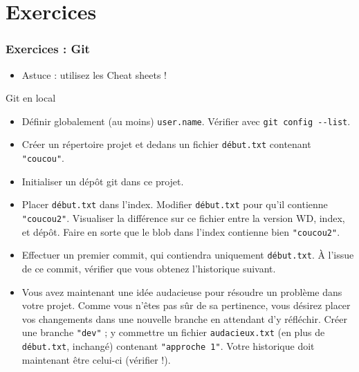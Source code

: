 \documentclass[english, french]{beamer}
\begin{document}
\section{Exercices}
\begin{frame}[allowframebreaks]
	\small
	\frametitle{Exercices : Git}
	\begin{itemize}
		\item Astuce : utilisez les Cheat sheets !
	\end{itemize}
	Git en local
	\begin{itemize}
		\item Définir globalement (au moins) \texttt{user.name}. Vérifier avec \texttt{git config -{}-list}.
		\item Créer un répertoire projet et dedans un fichier \texttt{début.txt} contenant \texttt{"coucou"}.
		\item Initialiser un dépôt git dans ce projet.
		\item Placer \texttt{début.txt} dans l’index. Modifier \texttt{début.txt} pour qu’il contienne \texttt{"coucou2"}. Visualiser la différence sur ce fichier entre la version WD, index, et dépôt. Faire en sorte que le blob dans l’index contienne bien \texttt{"coucou2"}.
		\item Effectuer un premier commit, qui contiendra uniquement \texttt{début.txt}. À l’issue de ce commit, vérifier que vous obtenez l’historique suivant.\par
		{
			\centering
			\par
		}
		\item Vous avez maintenant une idée audacieuse pour résoudre un problème dans votre projet. Comme vous n’êtes pas sûr de sa pertinence, vous désirez placer vos changements dans une nouvelle branche en attendant d’y réfléchir. Créer une branche \texttt{"dev"} ; y commettre un fichier \texttt{audacieux.txt} (en plus de \texttt{début.txt}, inchangé) contenant \texttt{"approche 1"}. Votre historique doit maintenant être celui-ci (vérifier !).\par
		{
			\centering
			}
\end{itemize}
\end{frame}
\end{document}
